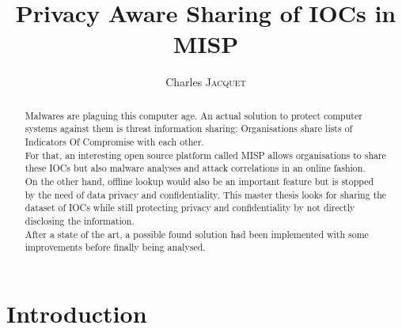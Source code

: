 \documentclass{eplmastersthesis}
\title{Privacy Aware Sharing of IOCs in MISP}	%
\author{Charles \textsc{Jacquet}}	%
\begin{document}
\maketitle					%
\thispagestyle{empty}		%


\begin{abstract} 
Malwares are plaguing this computer age. An actual solution to protect computer systems against them is threat information sharing: Organisations share lists of Indicators Of Compromise with each other.\\
For that, an interesting open source platform called MISP allows organisations to share these IOCs but also malware analyses and attack correlations in an online fashion.\\
On the other hand, offline lookup would also be an important feature but is stopped by the need of data privacy and confidentiality. This master thesis looks for sharing the dataset of IOCs while still protecting privacy and confidentiality by not directly disclosing the information. \\
After a state of the art, a possible found solution had been implemented with  some improvements before finally being analysed.
\end{abstract}


\renewcommand{\abstractname}{Acknowledgements}
\begin{abstract}
\end{abstract}

\tableofcontents

\chapter{Introduction}
\end{document}
